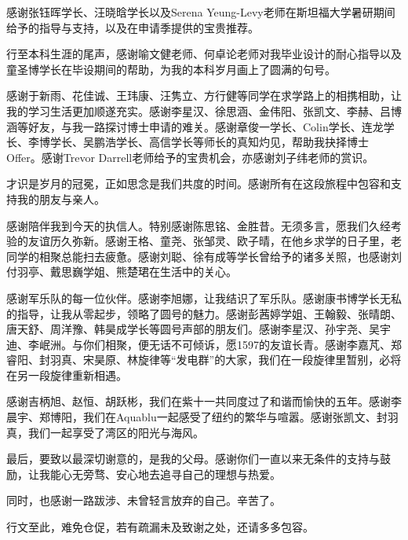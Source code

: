 \begin{acknowledgements}
感谢张钰晖学长、汪晓晗学长以及Serena Yeung-Levy老师在斯坦福大学暑研期间给予的指导与支持，以及在申请季提供的宝贵推荐。

行至本科生涯的尾声，感谢喻文健老师、何卓论老师对我毕业设计的耐心指导以及童圣博学长在毕设期间的帮助，为我的本科岁月画上了圆满的句号。

感谢于新雨、花佳诚、王玮康、汪隽立、方行健等同学在求学路上的相携相助，让我的学习生活更加顺遂充实。感谢李星汉、徐思涵、金伟阳、张凯文、李赫、吕博涵等好友，与我一路探讨博士申请的难关。感谢章俊一学长、Colin学长、连龙学长、李博学长、吴鹏浩学长、高信学长等师长的真知灼见，帮助我抉择博士Offer。感谢Trevor Darrell老师给予的宝贵机会，亦感谢刘子纬老师的赏识。

才识是岁月的冠冕，正如思念是我们共度的时间。感谢所有在这段旅程中包容和支持我的朋友与亲人。

感谢陪伴我到今天的执信人。特别感谢陈思铭、金胜昔。无须多言，愿我们久经考验的友谊历久弥新。感谢王格、童尧、张邹灵、欧子晴，在他乡求学的日子里，老同学的相聚总能扫去疲惫。感谢刘聪、徐有成等学长曾给予的诸多关照，也感谢刘付羽亭、戴思巍学姐、熊楚珺在生活中的关心。

感谢军乐队的每一位伙伴。感谢李旭娜，让我结识了军乐队。感谢康书博学长无私的指导，让我从零起步，领略了圆号的魅力。感谢彭茜婷学姐、王翰毅、张晴朗、唐天舒、周洋豫、韩昊成学长等圆号声部的朋友们。感谢李星汉、孙宇尧、吴宇迪、李岷洲。与你们相聚，便无话不可倾诉，愿1597的友谊长青。感谢李嘉芃、郑睿阳、封羽真、宋昊原、林旋律等“发电群”的大家，我们在一段旋律里暂别，必将在另一段旋律重新相遇。

感谢吉柄旭、赵恒、胡跃彬，我们在紫十一共同度过了和谐而愉快的五年。感谢李晨宇、郑博阳，我们在Aquablu一起感受了纽约的繁华与喧嚣。感谢张凯文、封羽真，我们一起享受了湾区的阳光与海风。

最后，要致以最深切谢意的，是我的父母。感谢你们一直以来无条件的支持与鼓励，让我能心无旁骛、安心地去追寻自己的理想与热爱。

同时，也感谢一路跋涉、未曾轻言放弃的自己。辛苦了。

行文至此，难免仓促，若有疏漏未及致谢之处，还请多多包容。


\end{acknowledgements}
